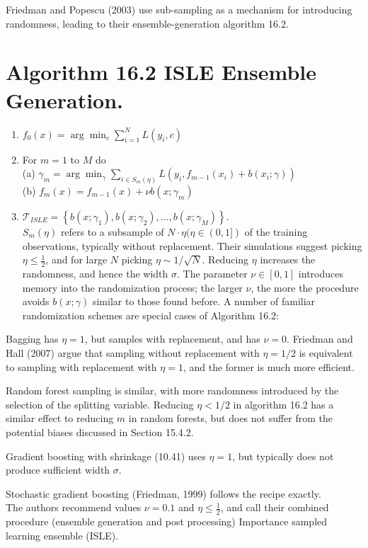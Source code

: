 \documentclass[10pt]{article}
\begin{document}
Friedman and Popescu (2003) use sub-sampling as a mechanism for introducing randomness, leading to their ensemble-generation algorithm 16.2.

\section*{Algorithm 16.2 ISLE Ensemble Generation.}
\begin{enumerate}
  \item $f_{0}(x)=\arg \min _{c} \sum_{i=1}^{N} L\left(y_{i}, c\right)$
  \item For $m=1$ to $M$ do\\
(a) $\gamma_{m}=\arg \min _{\gamma} \sum_{i \in S_{m}(\eta)} L\left(y_{i}, f_{m-1}\left(x_{i}\right)+b\left(x_{i} ; \gamma\right)\right)$\\
(b) $f_{m}(x)=f_{m-1}(x)+\nu b\left(x ; \gamma_{m}\right)$
  \item $\mathcal{T}_{I S L E}=\left\{b\left(x ; \gamma_{1}\right), b\left(x ; \gamma_{2}\right), \ldots, b\left(x ; \gamma_{M}\right)\right\}$.\\
$S_{m}(\eta)$ refers to a subsample of $N \cdot \eta(\eta \in(0,1])$ of the training observations, typically without replacement. Their simulations suggest picking $\eta \leq \frac{1}{2}$, and for large $N$ picking $\eta \sim 1 / \sqrt{N}$. Reducing $\eta$ increases the randomness, and hence the width $\sigma$. The parameter $\nu \in[0,1]$ introduces memory into the randomization process; the larger $\nu$, the more the procedure avoids $b(x ; \gamma)$ similar to those found before. A number of familiar randomization schemes are special cases of Algorithm 16.2:
\end{enumerate}

Bagging has $\eta=1$, but samples with replacement, and has $\nu=0$. Friedman and Hall (2007) argue that sampling without replacement with $\eta=1 / 2$ is equivalent to sampling with replacement with $\eta=1$, and the former is much more efficient.

Random forest sampling is similar, with more randomness introduced by the selection of the splitting variable. Reducing $\eta<1 / 2$ in algorithm 16.2 has a similar effect to reducing $m$ in random forests, but does not suffer from the potential biases discussed in Section 15.4.2.

Gradient boosting with shrinkage (10.41) uses $\eta=1$, but typically does not produce sufficient width $\sigma$.

Stochastic gradient boosting (Friedman, 1999) follows the recipe exactly.\\
The authors recommend values $\nu=0.1$ and $\eta \leq \frac{1}{2}$, and call their combined procedure (ensemble generation and post processing) Importance sampled learning ensemble (ISLE).
\end{document}
